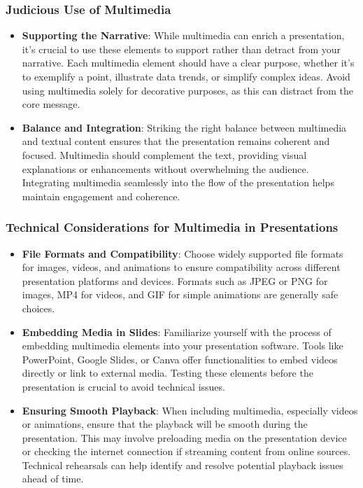 \documentclass[
]{book}
\begin{document}
\hypertarget{judicious-use-of-multimedia}{%
\subsubsection{Judicious Use of Multimedia}\label{judicious-use-of-multimedia}}

\begin{itemize}
\item
  \textbf{Supporting the Narrative}: While multimedia can enrich a presentation, it's crucial to use these elements to support rather than detract from your narrative. Each multimedia element should have a clear purpose, whether it's to exemplify a point, illustrate data trends, or simplify complex ideas. Avoid using multimedia solely for decorative purposes, as this can distract from the core message.
\item
  \textbf{Balance and Integration}: Striking the right balance between multimedia and textual content ensures that the presentation remains coherent and focused. Multimedia should complement the text, providing visual explanations or enhancements without overwhelming the audience. Integrating multimedia seamlessly into the flow of the presentation helps maintain engagement and coherence.
\end{itemize}

\hypertarget{technical-considerations-for-multimedia-in-presentations}{%
\subsubsection{Technical Considerations for Multimedia in Presentations}\label{technical-considerations-for-multimedia-in-presentations}}

\begin{itemize}
\item
  \textbf{File Formats and Compatibility}: Choose widely supported file formats for images, videos, and animations to ensure compatibility across different presentation platforms and devices. Formats such as JPEG or PNG for images, MP4 for videos, and GIF for simple animations are generally safe choices.
\item
  \textbf{Embedding Media in Slides}: Familiarize yourself with the process of embedding multimedia elements into your presentation software. Tools like PowerPoint, Google Slides, or Canva offer functionalities to embed videos directly or link to external media. Testing these elements before the presentation is crucial to avoid technical issues.
\item
  \textbf{Ensuring Smooth Playback}: When including multimedia, especially videos or animations, ensure that the playback will be smooth during the presentation. This may involve preloading media on the presentation device or checking the internet connection if streaming content from online sources. Technical rehearsals can help identify and resolve potential playback issues ahead of time.
\end{itemize}
\end{document}
